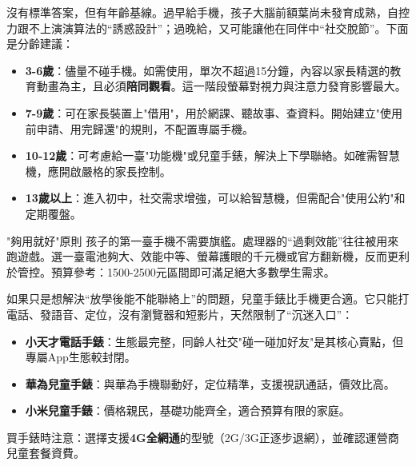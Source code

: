 


沒有標準答案，但有年齡基線。過早給手機，孩子大腦前額葉尚未發育成熟，自控力跟不上演演算法的“誘惑設計”；過晚給，又可能讓他在同伴中“社交脫節”。下面是分齡建議：

\begin{itemize}
  \item \textbf{3-6歲}：儘量不碰手機。如需使用，單次不超過15分鐘，內容以家長精選的教育動畫為主，且必須\textbf{陪同觀看}。這一階段螢幕對視力與注意力發育影響最大。
  \item \textbf{7-9歲}：可在家長裝置上"借用"，用於網課、聽故事、查資料。開始建立"使用前申請、用完歸還"的規則，不配置專屬手機。
  \item \textbf{10-12歲}：可考慮給一臺"功能機"或兒童手錶，解決上下學聯絡。如確需智慧機，應開啟嚴格的家長控制。
  \item \textbf{13歲以上}：進入初中，社交需求增強，可以給智慧機，但需配合"使用公約"和定期覆盤。
\end{itemize}

\begin{tcbinfo}{"夠用就好"原則}
孩子的第一臺手機不需要旗艦。處理器的“過剩效能”往往被用來跑遊戲。選一臺電池夠大、效能中等、螢幕護眼的千元機或官方翻新機，反而更利於管控。預算參考：1500-2500元區間即可滿足絕大多數學生需求。

\end{tcbinfo}


如果只是想解決“放學後能不能聯絡上”的問題，兒童手錶比手機更合適。它只能打電話、發語音、定位，沒有瀏覽器和短影片，天然限制了“沉迷入口”：

\begin{itemize}
  \item \textbf{小天才電話手錶}：生態最完整，同齡人社交"碰一碰加好友"是其核心賣點，但專屬App生態較封閉。
  \item \textbf{華為兒童手錶}：與華為手機聯動好，定位精準，支援視訊通話，價效比高。
  \item \textbf{小米兒童手錶}：價格親民，基礎功能齊全，適合預算有限的家庭。
\end{itemize}

買手錶時注意：選擇支援\textbf{4G全網通}的型號（2G/3G正逐步退網），並確認運營商兒童套餐資費。


